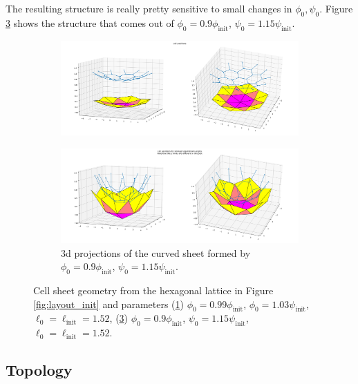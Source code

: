 \documentclass[draft]{article}
\begin{document}
The resulting structure is really pretty sensitive to small changes in $\phi_0, \psi_0$. Figure \ref{subfig:deep} shows the structure that comes out of $\phi_0 = 0.9 \phi_{\text{init}}$, $\psi_0 = 1.15\psi_{\text{init}}$. 

\begin{figure}[htbp]
    \centering
    \begin{subfigure}[b]{\textwidth}
        \centering 
        \includegraphics[width=\textwidth]{figures/numerical/shallow.png}
        \caption{}
        \label{subfig:shallow}
    \end{subfigure}
    \begin{subfigure}[b]{\textwidth}
        \centering
        \includegraphics[width=\textwidth]{figures/numerical/deep.png}
        \caption{3d projections of the curved sheet formed by $\phi_0 = 0.9 \phi_{\text{init}}$, $\psi_0 = 1.15\psi_{\text{init}}$. }
        \label{subfig:deep}
    \end{subfigure}
    \caption{Cell sheet geometry from the hexagonal lattice in Figure \ref{fig:layout_init} and parameters (\ref{subfig:shallow}) $\phi_0 = 0.99 \phi_{\text{init}}$, $\phi_0 = 1.03 \psi_{\text{init}}$, $\ell_0 = \ell_{\text{init}}=1.52$, (\ref{subfig:deep}) $\phi_0 = 0.9 \phi_{\text{init}}$, $\psi_0 = 1.15\psi_{\text{init}}$, $\ell_0 = \ell_{\text{init}}=1.52$. }
\end{figure}

\subsection{Topology}
\end{document}
